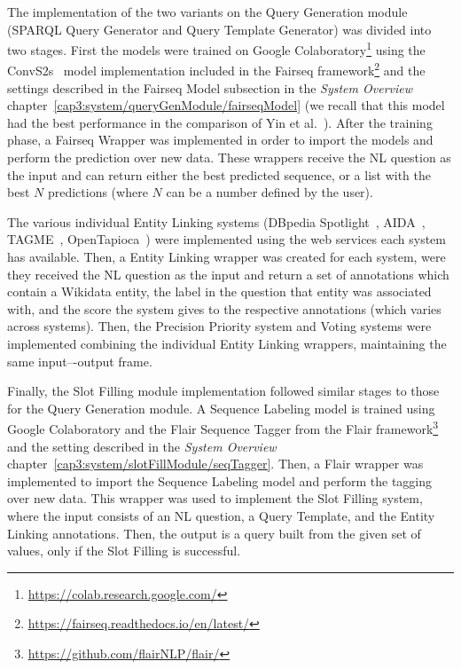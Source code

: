 The implementation of the two variants on the Query Generation module (SPARQL Query Generator 
and Query Template Generator) was divided into two stages. First the models were trained on 
Google Colaboratory\footnote{\url{https://colab.research.google.com/}} using the 
ConvS2s~\cite{nmt:convS2S-GehringAGYD17} model implementation included in the Fairseq 
framework\footnote{\url{https://fairseq.readthedocs.io/en/latest/}} and the settings described in the 
Fairseq Model subsection in the \textit{System Overview} chapter~\ref{cap3:system/queryGenModule/fairseqModel} 
(we recall that this model had 
the best performance in the comparison of Yin et al.~\cite{nmt:nl-to-sparql-Yin19}). After the 
training phase, a Fairseq Wrapper was implemented in order to import the models and perform the 
prediction over new data. These wrappers receive the NL question as the input and can return 
either the best predicted sequence, or a list with the best $N$ predictions (where $N$ can be a 
number defined by the user).

The various individual Entity Linking systems (DBpedia Spotlight~\cite{EL:dbpedia-spotlight-MendesJGB11}, 
AIDA~\cite{EL:aida-tool-YosefHBSW11, EL:aida-HoffartYBFPSTTW11}, TAGME~\cite{EL:tagme-FerraginaS10}, 
OpenTapioca~\cite{EL:opentapioca-Delpeuch19}) were implemented using the web services each system 
has available. Then, a Entity Linking wrapper was created for each system, were they received the 
NL question as the input and return a set of annotations which contain a Wikidata entity, the 
label in the question that entity was associated with, and the score the system gives to the 
respective annotations (which varies across systems). Then, the Precision Priority system and 
Voting systems were implemented combining the individual Entity Linking wrappers, maintaining 
the same input–-output frame.

Finally, the Slot Filling module implementation followed similar stages to those for the Query 
Generation module. A Sequence Labeling model is trained using Google Colaboratory and the Flair 
Sequence Tagger from the Flair framework\footnote{\url{https://github.com/flairNLP/flair/}} and 
the setting described in the \textit{System Overview} chapter~\ref{cap3:system/slotFillModule/seqTagger}. 
Then, a Flair wrapper was 
implemented to import the Sequence Labeling model and perform the tagging over new data. This 
wrapper was used to implement the Slot Filling system, where the input consists of an NL question, 
a Query Template, and the Entity Linking annotations. Then, the output is a \SPARQL{} query built 
from the given set of values, only if the Slot Filling is successful.

